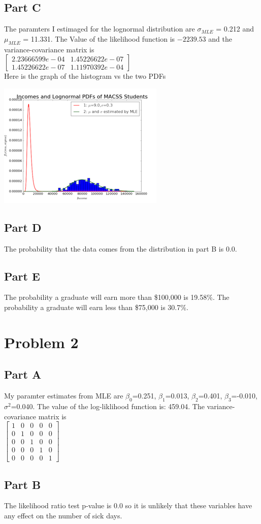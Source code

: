 \documentclass{article}
\begin{document}
\subsection*{Part C}
The paramters I estimaged for the lognormal distribution are $\sigma_{MLE}$ = 0.212 and $\mu_{MLE}$ = 11.331.  The Value of the likelihood function is $-2239.53$ and the variance-covariance matrix is
\\
$\begin{bmatrix} 2.23666599e-04 & 1.45226622e-07 \\ 1.45226622e-07 & 1.11970392e-04 \end{bmatrix}$
\\ Here is the graph of the histogram vs the two PDFs
\begin{center}\includegraphics{img1c.png}\end{center}
\subsection*{Part D}
The probability that the data comes from the distribution in part B is 0.0.
\subsection*{Part E}
The probability a graduate will earn more than \$100,000 is 19.58\%.  The probability a graduate will earn less than \$75,000 is 30.7\%.
\section*{Problem 2}

\subsection*{Part A}
My paramter estimates from MLE are $\beta_0$=0.251, $\beta_1$=0.013, $\beta_2$=0.401, $\beta_3$=-0.010, $\sigma^2$=0.040.  The value of the log-liklihood function is: 459.04.  The variance-covariance matrix is
\\
$\begin{bmatrix} 1&0&0&0&0 \\ 0&1&0&0&0 \\ 0&0&1&0&0 \\ 0&0&0&1&0 \\ 0&0&0&0&1 \end{bmatrix}$
\subsection*{Part B}
The likelihood ratio test p-value is 0.0 so it is unlikely that these variables have any effect on the number of sick days.
\end{document}
